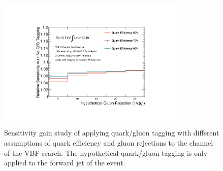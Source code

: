 

\begin{figure}[htpb]
\begin{center}
\includegraphics[width=0.8\textwidth]{figures/CNN/Relative_Gain.pdf}
\caption{Sensitivity gain study of applying quark/gluon tagging with different assumptions of quark efficiency and gluon rejections to the \twocentral channel of the VBF \Hbb search. The hypothetical quark/gluon tagging is only applied to the forward jet of the event.}
\label{fig:cnn-gain}
\end{center}
\end{figure}
